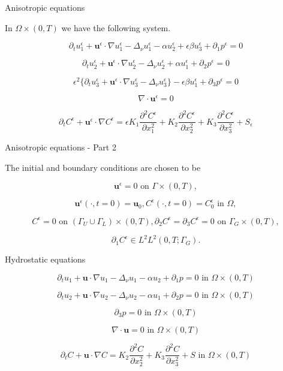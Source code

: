 \documentclass{beamer}
\begin{document}
\begin{frame}{Anisotropic equations}

  In $\Omega \times (0,T)$ we have the following system.

    \[ \partial_t u^\epsilon _1 + \mathbf{u}^\epsilon \cdot \nabla u^\epsilon _1 -\Delta_\nu u^\epsilon _1 -\alpha u_2^\epsilon + \epsilon \beta u_3^\epsilon + \partial_1 p^\epsilon = 0 \]
    
    \[ \partial_t u_2^\epsilon + \mathbf{u}^\epsilon \cdot \nabla u_2^\epsilon -\Delta_\nu u_2^\epsilon + \alpha u_1^\epsilon + \partial_2 p^\epsilon = 0 \]
    
    \[\epsilon^2 \{  \partial_t u_3^\epsilon + \mathbf{u}^\epsilon \cdot \nabla u_3^\epsilon -\Delta_\nu u_3^{\epsilon} \} - \epsilon \beta u_1^\epsilon + \partial_3 p^\epsilon = 0 \]
    
    \[ \nabla \cdot \mathbf{u}^\epsilon= 0  \]
    
    \[ \partial_t C^\epsilon + \mathbf{u}^\epsilon \cdot \nabla C^\epsilon = \epsilon K_1 \frac{\partial ^2 C^\epsilon}{\partial x_1 ^ 2} + K_2 \frac{\partial ^2 C^\epsilon}{\partial x_2 ^ 2} + K_3 \frac{\partial ^2 C^\epsilon}{\partial x_3 ^ 2} + S_\epsilon \]
    
\end{frame}

\begin{frame}{Anisotropic equations - Part 2}

  The initial and boundary conditions are chosen to be

    \[ \mathbf{u}^\epsilon = 0 \text{ on } \Gamma \times (0,T), \]
    
    \[ \mathbf{u}^\epsilon (\cdot, t = 0) = \mathbf{u}_0, C^\epsilon (\cdot, t=0) = C^\epsilon_0  \text{ in } \Omega, \]

    $$C^\epsilon = 0 \text{ on } ( \Gamma_U \cup \Gamma_L) \times (0,T), \partial_2 C^\epsilon = \partial_3 C^\epsilon = 0 \text{ on } \Gamma_G \times (0,T),$$
    
    $$\partial_1 C^\epsilon \in L^2 L^2 (0,T; \Gamma_G). $$

\end{frame}

\begin{frame}{Hydrostatic equations}
  
      \[ \partial_t u_1 + \mathbf{u} \cdot \nabla u_1 - \Delta_\nu u_1 -\alpha u_2 + \partial_1 p = 0 \text{ in } \Omega \times (0,T) \]
    
    \[ \partial_t u_2 + \mathbf{u} \cdot \nabla u_2 - \Delta_\nu u_2 -\alpha u_1 + \partial_2 p = 0 \text{ in } \Omega \times (0,T) \]
    
    \[ \partial_3 p = 0 \text{ in } \Omega \times (0,T) \]
    
    \[ \nabla \cdot \mathbf{u} = 0 \text{ in } \Omega \times (0,T) \]
    
    \[ \partial_t C + \mathbf{u} \cdot \nabla C = K_2 \frac{\partial ^2 C}{\partial x_2 ^ 2} + K_3 \frac{\partial ^2 C}{\partial x_3 ^ 2} + S \text{ in } \Omega \times (0,T)\]

\end{frame}
    
\end{document}
